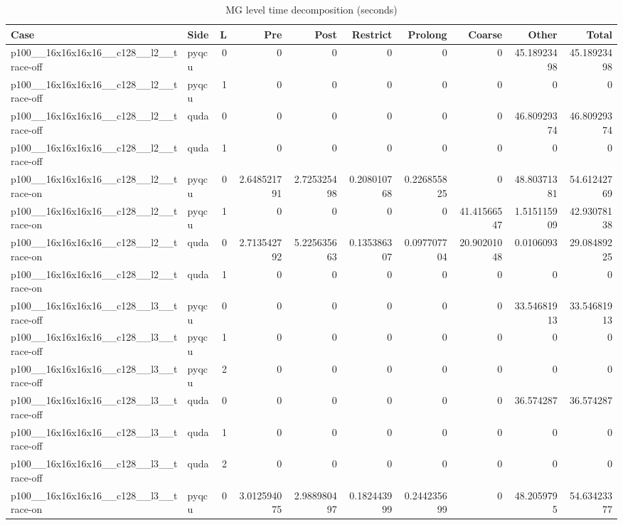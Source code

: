 
\begin{table}[htbp]
\centering
\caption{MG level time decomposition (seconds)}
\small
\begin{tabular}{@{}llrrrrrrrr@{}}
\toprule
Case & Side & L & Pre & Post & Restrict & Prolong & Coarse & Other & Total \\
\midrule
p100\_\_16x16x16x16\_\_c128\_\_l2\_\_trace-off & pyqcu & 0 & 0 & 0 & 0 & 0 & 0 & 45.18923498 & 45.18923498 \\
p100\_\_16x16x16x16\_\_c128\_\_l2\_\_trace-off & pyqcu & 1 & 0 & 0 & 0 & 0 & 0 & 0 & 0 \\
p100\_\_16x16x16x16\_\_c128\_\_l2\_\_trace-off & quda & 0 & 0 & 0 & 0 & 0 & 0 & 46.80929374 & 46.80929374 \\
p100\_\_16x16x16x16\_\_c128\_\_l2\_\_trace-off & quda & 1 & 0 & 0 & 0 & 0 & 0 & 0 & 0 \\
p100\_\_16x16x16x16\_\_c128\_\_l2\_\_trace-on & pyqcu & 0 & 2.648521791 & 2.725325498 & 0.208010768 & 0.226855825 & 0 & 48.80371381 & 54.61242769 \\
p100\_\_16x16x16x16\_\_c128\_\_l2\_\_trace-on & pyqcu & 1 & 0 & 0 & 0 & 0 & 41.41566547 & 1.515115909 & 42.93078138 \\
p100\_\_16x16x16x16\_\_c128\_\_l2\_\_trace-on & quda & 0 & 2.713542792 & 5.225635663 & 0.135386307 & 0.097707704 & 20.90201048 & 0.0106093 & 29.08489225 \\
p100\_\_16x16x16x16\_\_c128\_\_l2\_\_trace-on & quda & 1 & 0 & 0 & 0 & 0 & 0 & 0 & 0 \\
p100\_\_16x16x16x16\_\_c128\_\_l3\_\_trace-off & pyqcu & 0 & 0 & 0 & 0 & 0 & 0 & 33.54681913 & 33.54681913 \\
p100\_\_16x16x16x16\_\_c128\_\_l3\_\_trace-off & pyqcu & 1 & 0 & 0 & 0 & 0 & 0 & 0 & 0 \\
p100\_\_16x16x16x16\_\_c128\_\_l3\_\_trace-off & pyqcu & 2 & 0 & 0 & 0 & 0 & 0 & 0 & 0 \\
p100\_\_16x16x16x16\_\_c128\_\_l3\_\_trace-off & quda & 0 & 0 & 0 & 0 & 0 & 0 & 36.574287 & 36.574287 \\
p100\_\_16x16x16x16\_\_c128\_\_l3\_\_trace-off & quda & 1 & 0 & 0 & 0 & 0 & 0 & 0 & 0 \\
p100\_\_16x16x16x16\_\_c128\_\_l3\_\_trace-off & quda & 2 & 0 & 0 & 0 & 0 & 0 & 0 & 0 \\
p100\_\_16x16x16x16\_\_c128\_\_l3\_\_trace-on & pyqcu & 0 & 3.012594075 & 2.988980497 & 0.182443999 & 0.244235699 & 0 & 48.2059795 & 54.63423377 \\

\end{tabular}
\end{table}
